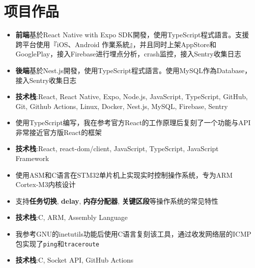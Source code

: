 \documentclass{resume}
\begin{document}
\section{ 项目作品}
        \begin{itemize}
            \item \textbf{前端}基於React Native with Expo SDK開發，使用TypeScript程式語言。支援跨平台使用『iOS、Android 作業系統』，并且同时上架AppStore和GooglePlay，接入Firebase进行埋点分析，crash监控，接入Sentry收集日志
            \item \textbf{後端}基於Nest.js開發，使用TypeScript程式語言。使用MySQL作為Database，接入Sentry收集日志
            \item \textbf{技术栈}:React, React Native, Expo, Node.js, JavaScript, TypeScript, GitHub, Git, Github Actions, Linux, Docker, Nest.js, MySQL, Firebase, Sentry
        \end{itemize}
        \begin{itemize}
            \item 使用TypeScript编写，我在参考官方React的工作原理后复刻了一个功能与API非常接近官方版React的框架
            \item \textbf{技术栈}:React, react-dom/client, JavaScript, TypeScript, JavaScript Framework
        \end{itemize}
        \begin{itemize}
            \item 使用ASM和C语言在STM32单片机上实现实时控制操作系统，专为ARM Cortex-M3内核设计
            \item 支持\textbf{任务切换}, \textbf{delay}, \textbf{内存分配器}, \textbf{关键区段}等操作系统的常见特性
            \item \textbf{技术栈}:C, ARM, Assembly Language
        \end{itemize}
        \begin{itemize}
            \item 我参考GNU的inetutils功能后使用C语言复刻该工具，通过收发网络层的ICMP包实现了\texttt{ping}和\texttt{traceroute}
            \item \textbf{技术栈}:C, Socket API, GitHub Actions
        \end{itemize}
\end{document}
